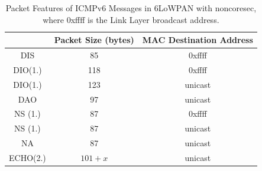 \begin{table}[ht!]
	\center
	\begin{tabular}{|c|c|c|}
		\hline
		       & Packet Size (bytes) & MAC Destination Address \\ \hline
		DIS    & 85                  & 0xffff                       \\ \hline
		DIO(1.) & 118                 & 0xffff                       \\ \hline
		DIO(1.) & 123                 & unicast                      \\ \hline
		DAO    & 97                  & unicast                      \\ \hline
		NS (1.) & 87                  & 0xffff                       \\ \hline
		NS (1.) & 87                  & unicast                      \\ \hline
		NA     & 87                  & unicast                      \\ \hline
		ECHO(2.)   & $101+x$               & unicast                      \\ \hline
	\end{tabular}
	\caption{Packet Features of ICMPv6 Messages in 6LoWPAN with noncoresec, where 0xffff is the Link Layer broadcast address.}
	\label{Tbl: Packet Features of ICMPv6 Messages in 6LoWPAN with noncoresec}
\end{table}


